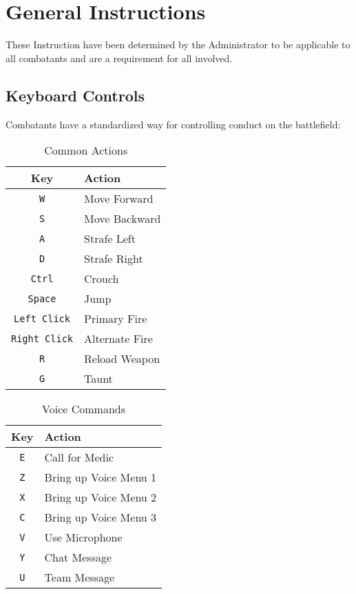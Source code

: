 \section{General Instructions}
\label{general_instructions}

These Instruction have been determined by the Administrator to be applicable to all combatants and are a requirement for all involved. 

\subsection{Keyboard Controls}
Combatants have a standardized way for controlling conduct on the battlefield:

\begin{table}[h!b!p!]
\caption{Common Actions}
\begin{center}
\begin{tabular}{|c|l|}
	\hline
		Key & Action\\
	\hline
	\texttt{W}&Move Forward\\
	\texttt{S}&Move Backward\\
	\texttt{A}&Strafe Left\\
	\texttt{D}&Strafe Right\\
	\texttt{Ctrl}&Crouch\\
	\texttt{Space}&Jump\\
	\texttt{Left Click}&Primary Fire\\
	\texttt{Right Click}&Alternate Fire\\
	\texttt{R}&Reload Weapon\\
	\texttt{G}&Taunt\\
  	\hline
\end{tabular}
\end{center}
\label{table_common_actions}
\end{table}

\begin{table}[h!b!p!]
\caption{Voice Commands}
\begin{center}
\begin{tabular}{|c|l|}
	\hline
		Key & Action\\
	\hline
	\texttt{E}&Call for Medic\\
	\texttt{Z}&Bring up Voice Menu 1\\
	\texttt{X}&Bring up Voice Menu 2\\
	\texttt{C}&Bring up Voice Menu 3\\
	\texttt{V}&Use Microphone\\
	\texttt{Y}&Chat Message\\
	\texttt{U}&Team Message\\
  	\hline
\end{tabular}
\end{center}
\label{table_voice_commands}
\end{table}

